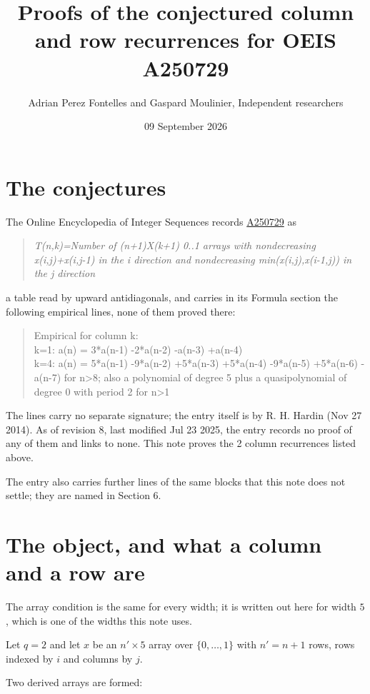 \documentclass[11pt]{article}
\title{Proofs of the conjectured column and row recurrences for OEIS A250729}
\author{Adrian Perez Fontelles and Gaspard Moulinier, Independent researchers}
\date{09 September 2026}
\theoremstyle{definition}
\begin{document}
\maketitle
\section{The conjectures}

The Online Encyclopedia of Integer Sequences records \href{https://oeis.org/A250729}{A250729} as

\begin{quote}\itshape T(n,k)=Number of (n+1)X(k+1) 0..1 arrays with nondecreasing x(i,j)+x(i,j-1) in the i direction and nondecreasing min(x(i,j),x(i-1,j)) in the j direction\end{quote}

a table read by upward antidiagonals, and carries in its Formula section the following empirical lines, none of them proved there:

\begin{quote}\ttfamily Empirical for column k:\\
k=1: a(n) = 3*a(n-1) -2*a(n-2) -a(n-3) +a(n-4)\\k=4: a(n) = 5*a(n-1) -9*a(n-2) +5*a(n-3) +5*a(n-4) -9*a(n-5) +5*a(n-6) -a(n-7) for n>8; also a polynomial of degree 5 plus a quasipolynomial of degree 0 with period 2 for n>1\end{quote}

The lines carry no separate signature; the entry itself is by R. H. Hardin (Nov 27 2014). As of revision 8, last modified Jul 23 2025, the entry records no proof of any of them and links to none. This note proves the 2 column recurrences listed above.

The entry also carries further lines of the same blocks that this note does not settle; they are named in Section 6.

\section{The object, and what a column and a row are}

The array condition is the same for every width; it is written out here for width $5$, which is one of the widths this note uses.

Let $q = 2$ and let $x$ be an $n' \times 5$ array over $\{0,\dots,1\}$ with $n' = n + 1$ rows, rows indexed by $i$ and columns by $j$.

Two derived arrays are formed:
\end{document}
